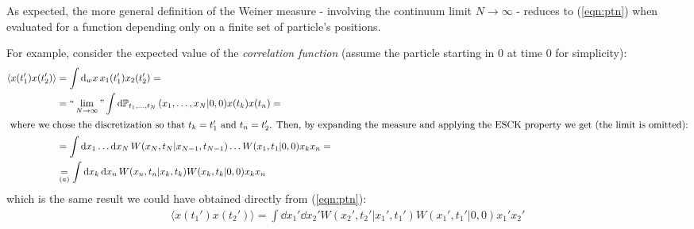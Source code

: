 \documentclass[../template.tex]{subfiles}
\begin{document}
\begin{example}
    As expected, the more general definition of the Weiner measure - involving the continuum limit $N \to \infty$ - reduces to (\ref{eqn:ptn}) when evaluated for a function depending only on a finite set of particle's positions. 

    For example, consider the expected value of the \textit{correlation function} (assume the particle starting in $0$ at time $0$ for simplicity):
    \begin{align*}
        \langle x(t_1') x(t_2') \rangle &= \int \dd{_wx} x_1(t_1') x_2(t_2') =\\
        &= ``\lim_{N \to \infty}" \int \dd{\mathbb{P}}_{t_1, \dots, t_N}(x_1, \dots, x_N|0,0)x(t_k) x(t_n) = \\
    \intertext{
    where we chose the discretization so that $t_k = t_1'$ and $t_n = t_2'$. Then, by expanding the measure and applying the ESCK property we get (the limit is omitted):}
    &=\int \dd{x_1}\dots \dd{x_N} W(x_N,t_N|x_{N-1},t_{N-1}) \dots W(x_1, t_1|0,0) x_k x_n=\\
    &\underset{(a)}{=} \int \dd{x_k} \dd{x_n} W(x_n,t_n|x_k,t_k) W(x_k,t_k|0,0) x_k x_n
    \end{align*}
    which is the same result we could have obtained directly from (\ref{eqn:ptn}): 
    \begin{align*}
        \langle x(t_1') x(t_2') \rangle = \int \dd{x_1'} \dd{x_2'} W(x_2',t_2'|x_1',t_1') W(x_1',t_1'|0,0) x_1' x_2' 
    \end{align*}
\end{example}

      
\end{document}
